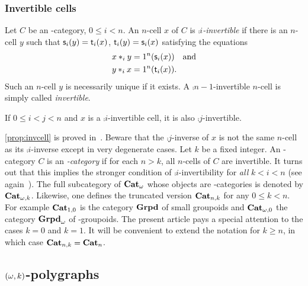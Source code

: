\subsubsection{Invertible cells}\label{ssubsec:invert}
Let $C$ be an \oo-category, $0\leq i <n$. An $n$-cell $x$ of $C$ is {\em $\comp i$-invertible} if there is an $n$-cell $y$ such that $\mathsf{s}_{i}(y)=\mathsf{t}_{i}(x)$, $\mathsf{t}_{i}(y)=\mathsf{s}_{i}(x)$ satisfying the equations 
  \begin{align*}
    x\ast_{i} y & = 1^{n}(\mathsf{s}_{i}(x)) \quad \hbox{and}\\
    y\ast_{i} x & =  1^{n}(\mathsf{t}_{i}(x)).
  \end{align*}
  Such an $n$-cell $y$ is necessarily unique if it exists. A
  $\comp {n-1}$-invertible $n$-cell is simply called {\em invertible}. 
  \begin{proposition}\label{prop:invcell}
    If $0\leq i< j<n$ and $x$ is a $\comp i$-invertible cell, it is also $\comp j$-invertible.
  \end{proposition}
  \begin{paragr}
    \cref{prop:invcell} is proved
    in~\cite[14.5]{abgmmm:polybk}. Beware that the $\comp j$-inverse
    of $x$ is not the same $n$-cell as its $\comp i$-inverse except in
    very degenerate cases. Let $k$ be a fixed integer. An \oo-category
    $C$ is an {\em {}-category} if for each $n>k$, all $n$-cells
    of $C$ are invertible. It turns out that this implies the stronger
    condition of $\comp i$-invertibility for {\em all} $k<i<n$ (see
    again~\cite[14.5]{abgmmm:polybk}).  The full subcategory of
    $\mathbf{Cat}_{\omega}$ whose objects are -categories is denoted by $\mathbf{Cat}_{\omega,k}$. Likewise, one defines the truncated version $\mathbf{Cat}_{n,k}$ for
    any $0\leq k<n$.  For example $\mathbf{Cat}_{1,0}$ is the category $\mathbf{Grpd}$
    of small groupoids and $\mathbf{Cat}_{\omega,0}$ the category $\mathbf{Grpd}_{\omega}$ of
    \oo-groupoids. The present article pays a special attention to the
    cases $k=0$ and $k=1$. It will be convenient to extend the
    notation for $k\geq n$, in which case $\mathbf{Cat}_{n,k}=\mathbf{Cat}_{n}$.
 \end{paragr} 


 \subsection{$(\omega,k)$-polygraphs}\label{subsec:okpol}
